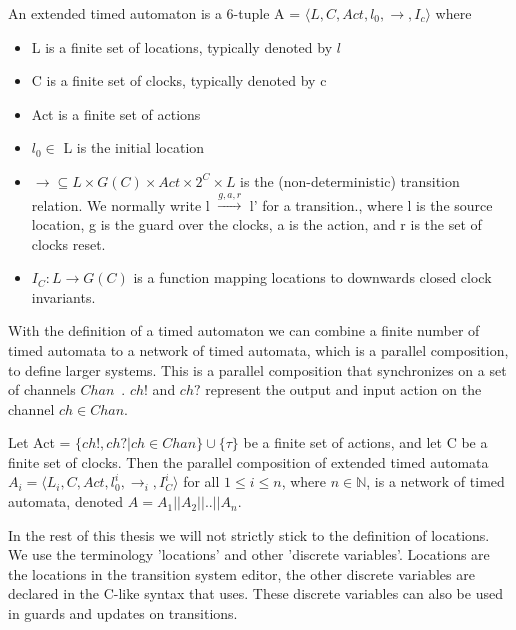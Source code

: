 \begin{mydef}
\label{def:TA}
An extended timed automaton is a 6-tuple A = $\langle L, C, Act, l_0, \rightarrow, I_c\rangle$ where
{\renewcommand\labelitemi{--}
	\begin{itemize}
		\item L is a finite set of locations, typically denoted by $l$
		\item C is a finite set of clocks, typically denoted by c
		\item Act is a finite set of actions
		\item $l_0 \in$ L is the initial location
		\item $\rightarrow \subseteq L \times G(C) \times Act \times 2^C \times L$ is the (non-deterministic) transition relation. We normally write l $\stackrel{g,a,r}{\longrightarrow}$ l' for a transition., where l is the source location, g is the guard over the clocks, a is the action, and r is the set of clocks reset.
		\item $I_C : L \rightarrow G(C)$ is a function mapping locations to downwards closed clock invariants.
	\end{itemize}
}
\end{mydef}

With the definition of a timed automaton we can combine a finite number of timed automata to a network of timed automata, which is a parallel composition, to define larger systems. This is a parallel composition that synchronizes on a set of channels $Chan$~\cite{UPPAAL}. $ch!$ and $ch?$ represent the output and input action on the channel $ch \in Chan$.

\begin{mydef}
\label{def:networkTA}
Let Act = $\{ch!,ch?|ch \in Chan\} \cup \{\tau\}$ be a finite set of actions, and let C be a finite set of clocks. Then the parallel composition of extended timed automata $A_i = \langle L_i, C, Act, l^i_0, \rightarrow_{i}, I^i_C\rangle$ for all $1 \leq i \leq n$, where $n \in \mathbb{N}$, is a network of timed automata, denoted $A = A_1||A_2||..||A_n$.
\end{mydef}

In the rest of this thesis we will not strictly stick to the definition of locations. We use the terminology 'locations' and other 'discrete variables'. Locations are the locations in the \uppaal{} transition system editor, the other discrete variables are declared in the C-like syntax that \uppaal{} uses. These discrete variables can also be used in guards and updates on transitions.

